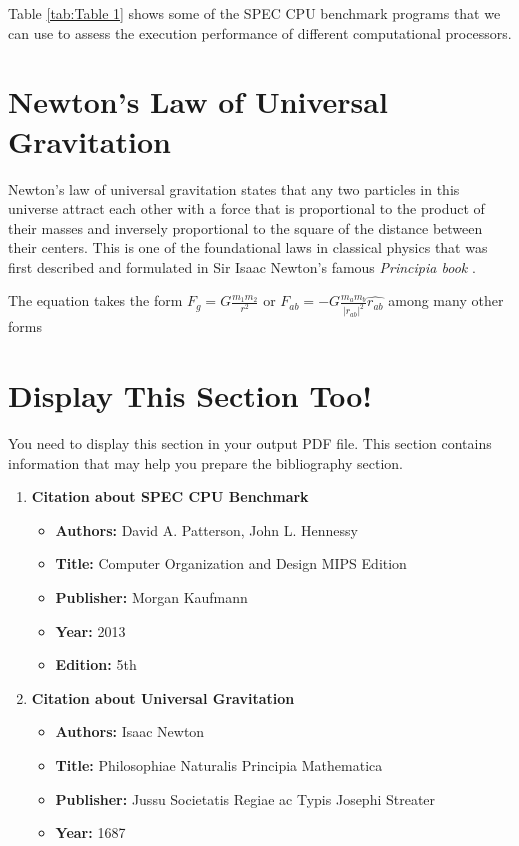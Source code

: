 \documentclass[11pt]{article}
\begin{document}
Table \ref{tab:Table 1} shows some of the SPEC CPU benchmark programs that we can use to assess the execution performance of different computational processors.

\newpage

\section*{Newton’s Law of Universal Gravitation}

\noindent Newton’s law of universal gravitation states that any two particles in this universe attract each other with a force that is proportional to the product of their masses and inversely proportional to the square of the distance between their centers. This is one of the foundational laws in classical physics that was first described and formulated in Sir Isaac Newton’s
famous \textit{Principia book} \cite{newton2016principia} .

The equation takes the form $F_g = G \frac{m_1 m_2}{r^2}$ or $F_{ab} = -G \frac{m_a m_b}{|r_{ab}|^2} \hat{r_{ab}} $ among many other forms

\section*{Display This Section Too!}
You need to display this section in your output PDF file. This section contains information that may help you prepare the bibliography section.
\begin{enumerate}
    \item \textbf{Citation about SPEC CPU Benchmark}
    \begin{itemize}
        \item  \textbf{Authors:} David A. Patterson, John L. Hennessy
        \item \textbf{Title:} Computer Organization and Design MIPS Edition 
        \item \textbf{Publisher:} Morgan Kaufmann 
        \item \textbf{Year:} 2013
        \item \textbf{Edition:} 5th
    \end{itemize}
    \item \textbf{Citation about Universal Gravitation}
    \begin{itemize}
        \item \textbf{Authors:} Isaac Newton 
        \item \textbf{Title:} Philosophiae Naturalis Principia Mathematica 
        \item \textbf{Publisher:} Jussu Societatis Regiae ac Typis Josephi Streater
        \item \textbf{Year:} 1687
    \end{itemize}
\end{enumerate}



% 
% 



    
\end{document}
